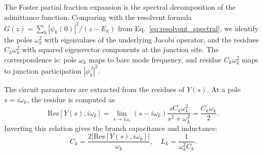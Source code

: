 \documentclass[reprint, floatfix, superscriptaddress, amsmath, amssymb, longbibliography]{revtex4-2}
\begin{document}
The Foster partial fraction expansion is the spectral decomposition of the admittance function. Comparing with the resolvent formula $G(z) = \sum_k |\psi_k(0)|^2/(z - E_k)$ from Eq.~\eqref{eq:resolvent_spectral}, we identify the poles $\omega_k^2$ with eigenvalues of the underlying Jacobi operator, and the residues $C_k \omega_k^2$ with squared eigenvector components at the junction site. The correspondence is: pole $\omega_k$ maps to bare mode frequency, and residue $C_k \omega_k^2$ maps to junction participation $|\phi_k^J|^2$.

The circuit parameters are extracted from the residues of $Y(s)$. At a pole $s = i\omega_k$, the residue is computed as
\begin{equation}
\mathrm{Res}[Y(s), i\omega_k] = \lim_{s \to i\omega_k} (s - i\omega_k) \frac{sC_k \omega_k^2}{s^2 + \omega_k^2} = \frac{C_k \omega_k}{2}.
\label{eq:residue_result}
\end{equation}
Inverting this relation gives the branch capacitance and inductance:
\begin{equation}
C_k = \frac{2|\mathrm{Res}[Y(s), i\omega_k]|}{\omega_k}, \quad L_k = \frac{1}{\omega_k^2 C_k}.
\label{eq:foster_params}
\end{equation}
\end{document}
